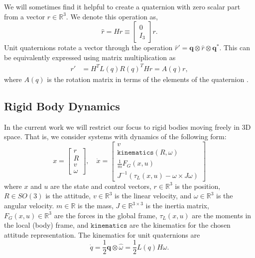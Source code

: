 \documentclass[letterpaper, 10 pt, conference]{ieeeconf}  %
\newcommand{\half}{\frac{1}{2}}
\newcommand{\R}{\mathbb{R}}
\newcommand{\q}{\textbf{q}}
\begin{document}
        We will sometimes find it helpful to create a quaternion with zero scalar part from 
        a vector $r \in \R^3$. We denote this operation as,
        \begin{equation}
            \hat{r} = H r \equiv \begin{bmatrix} 0 \\ I_3 \end{bmatrix} r.
        \end{equation}
        Unit quaternions rotate a vector through the operation 
        $\hat{r}' = \q \otimes \hat{r} \otimes \q^*$. 
        This can be equivalently expressed using matrix multiplication as
        \begin{align} 
            r' &= H^T L(q) R(q)^T H r = A(q)r , \label{eq:quaternion_rotation}
        \end{align}
        where $A(q)$ is the rotation matrix in terms of the elements of the quaternion 
        \cite{markley2014fundamentals}. 

    \subsection{Rigid Body Dynamics} \label{sec:rigidbody_dynamics}
        In the current work we will restrict our focus to rigid bodies moving freely in 3D 
        space. That is, we consider systems with dynamics of the following form:
        \begin{equation} \label{eq:rigid_body_dynamics}
            x = \begin{bmatrix} r \\ R \\ v \\ \omega \end{bmatrix}, \quad 
            \dot{x} = \begin{bmatrix} 
                v \\ 
                \texttt{kinematics}(R,\omega) \\ 
                \frac{1}{m} F_G(x,u) \\ 
                J^{-1}(\tau_L(x,u) - \omega \times J \omega) 
            \end{bmatrix}
        \end{equation}
        where $x$ and $u$ are the state and control vectors, $r \in \R^3$ is the position, 
        $R \in SO(3)$ is the attitude, $v \in \R^3$ is the linear velocity, and 
        $\omega \in \R^3$ is the angular velocity. $m \in \R$ is the mass, 
        $J \in \R^{3\times3}$ is the inertia matrix, $F_G(x,u) \in \R^3$ are the forces in the 
        global frame, $\tau_L(x,u)$ are the moments in the local (body) frame, and 
        $\texttt{kinematics}$ are the kinematics for the chosen attitude representation. The 
        kinematics for unit quaternions are
        \begin{equation}
            \dot{q} = \half \q \otimes \hat{\omega} = \half L(q) H \omega.
        \end{equation}
\end{document}
